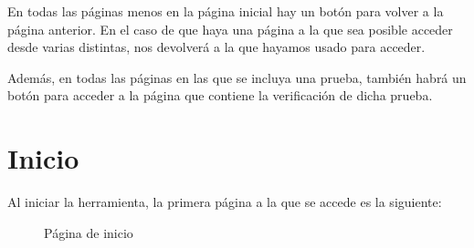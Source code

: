 En todas las páginas menos en la página inicial hay un botón para volver a la página anterior. En el caso de que haya una página a la que sea posible acceder desde varias distintas, nos devolverá a la que hayamos usado para acceder.

Además, en todas las páginas en las que se incluya una prueba, también habrá un botón para acceder a la página que contiene la verificación de dicha prueba.

\section*{Inicio}

Al iniciar la herramienta, la primera página a la que se accede es la siguiente:
\begin{figure}[H]
    \centering
    \caption{Página de inicio}
    \label{im:input}
\end{figure}

